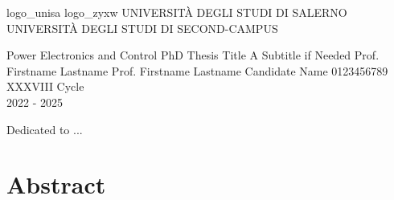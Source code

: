 \documentclass{pv_phd}
\begin{document}
\pagestyle{empty}

\setuniversities
  {logo_unisa}  
  {logo_zyxw}          
  {UNIVERSITÀ DEGLI STUDI DI SALERNO}
  {UNIVERSITÀ DEGLI STUDI DI SECOND-CAMPUS} 

\makefrontpage
  {Power Electronics and Control}      %
  {PhD Thesis Title}                   %
  {A Subtitle if Needed}               %
  {Prof. Firstname Lastname}           %
  {Prof. Firstname Lastname}           %
  {Candidate Name}                     %
  {0123456789}                         %
  {XXXVIII Cycle \\ 2022 - 2025}       %

\cleardoublepage
\thispagestyle{empty}

\cleardoublepage

\cleardoublepage
\begin{dedication}

    Dedicated to ...
    
\end{dedication}

\cleardoublepage
\tableofcontents
\clearpage
\sloppy
{}

\clearpage
\listoffigures
{}

\clearpage
\listoftables
{}

\cleardoublepage        %
\setcounter{page}{1}    %
\pagestyle{headings}    %

\chapter*{Abstract}
\blindtext[2] %
\end{document}

